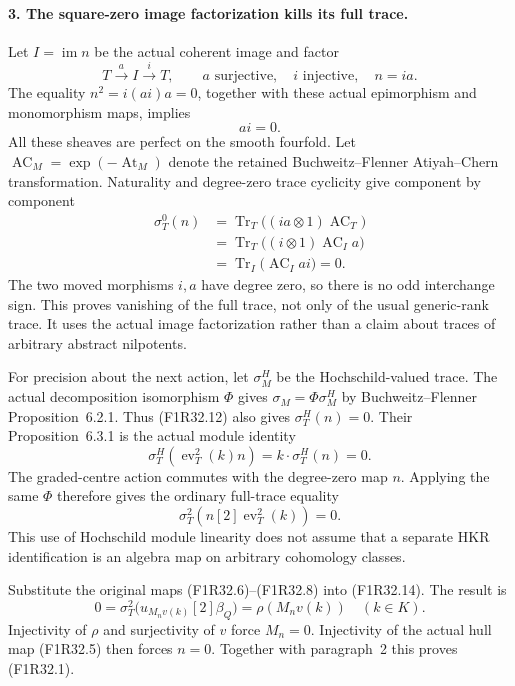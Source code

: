 \paragraph{3. The square-zero image factorization kills its full trace.}
Let $I=\operatorname{im}n$ be the
actual coherent image and factor
\[
                T\xrightarrow{a}I\xrightarrow{i}T,
                  \qquad a\text{ surjective},\quad
                  i\text{ injective},\quad n=ia.
 \tag{F1R32.10}
\]
The equality $n^2=i(ai)a=0$,
together with these actual epimorphism
and monomorphism maps, implies
\[
                                  ai=0.
 \tag{F1R32.11}
\]
All these sheaves are perfect on
the smooth fourfold. Let
$\operatorname{AC}_M=\exp(-\operatorname{At}_M)$
denote the retained Buchweitz--Flenner
Atiyah--Chern transformation.
Naturality and degree-zero trace
cyclicity give component by component
\[
 \begin{split}
 \sigma_T^0(n)
   &=\operatorname{Tr}_T\bigl((ia\otimes1)\operatorname{AC}_T\bigr)\\
   &=\operatorname{Tr}_T\bigl((i\otimes1)\operatorname{AC}_I a\bigr)\\
   &=\operatorname{Tr}_I\bigl(\operatorname{AC}_I ai\bigr)=0.
 \end{split}
 \tag{F1R32.12}
\]
The two moved morphisms $i,a$ have
degree zero, so there is no odd
interchange sign. This proves
vanishing of the full trace, not
only of the usual generic-rank trace.
It uses the actual image factorization
rather than a claim about traces of
arbitrary abstract nilpotents.

For precision about the next action,
let $\sigma_M^H$ be the Hochschild-valued
trace. The actual decomposition
isomorphism $\Phi$ gives
$\sigma_M=\Phi\sigma_M^H$ by
Buchweitz--Flenner Proposition~6.2.1.
Thus (F1R32.12) also gives
$\sigma_T^H(n)=0$.
Their Proposition~6.3.1 is the actual
module identity
\[
       \sigma_T^H(\operatorname{ev}_T^2(k)n)
                             =k\cdot\sigma_T^H(n)=0.
 \tag{F1R32.13}
\]
The graded-centre action commutes
with the degree-zero map $n$.
Applying the same $\Phi$ therefore
gives the ordinary full-trace equality
\[
                          \sigma_T^2(n[2]\operatorname{ev}_T^2(k))=0.
 \tag{F1R32.14}
\]
This use of Hochschild module linearity
does not assume that a separate HKR
identification is an algebra map on
arbitrary cohomology classes.

Substitute the original maps
(F1R32.6)--(F1R32.8) into
(F1R32.14). The result is
\[
          0=\sigma_T^2\bigl(u_{M_n v(k)}[2]\beta_Q\bigr)
                              =\rho(M_n v(k))
                               \quad(k\in K).
 \tag{F1R32.15}
\]
Injectivity of $\rho$ and surjectivity
of $v$ force $M_n=0$. Injectivity
of the actual hull map (F1R32.5)
then forces $n=0$. Together with
paragraph~2 this proves (F1R32.1).

